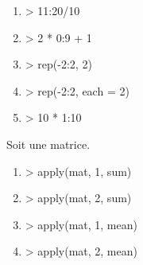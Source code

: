 \begin{reponse}{3.2}
    \begin{enumerate}
\item
\begin{Schunk}
\begin{Sinput}
> 11:20/10
\end{Sinput}
\end{Schunk}
\item
\begin{Schunk}
\begin{Sinput}
> 2 * 0:9 + 1
\end{Sinput}
\end{Schunk}
\item
\begin{Schunk}
\begin{Sinput}
> rep(-2:2, 2)
\end{Sinput}
\end{Schunk}
\item
\begin{Schunk}
\begin{Sinput}
> rep(-2:2, each = 2)
\end{Sinput}
\end{Schunk}
\item
\begin{Schunk}
\begin{Sinput}
> 10 * 1:10
\end{Sinput}
\end{Schunk}
    \end{enumerate}
  
\end{reponse}
\begin{reponse}{3.3}
    Soit  une matrice.
    \begin{enumerate}
\item
\begin{Schunk}
\begin{Sinput}
> apply(mat, 1, sum)
\end{Sinput}
\end{Schunk}
\item
\begin{Schunk}
\begin{Sinput}
> apply(mat, 2, sum)
\end{Sinput}
\end{Schunk}
\item
\begin{Schunk}
\begin{Sinput}
> apply(mat, 1, mean)
\end{Sinput}
\end{Schunk}
\item
\begin{Schunk}
\begin{Sinput}
> apply(mat, 2, mean)
\end{Sinput}
\end{Schunk}
    \end{enumerate}
  
\end{reponse}
